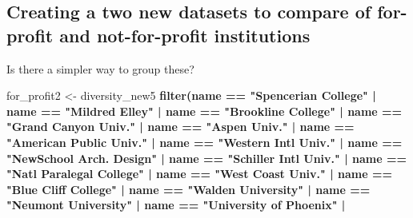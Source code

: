\documentclass[
]{article}
\newenvironment{Shaded}{\begin{snugshade}}{\end{snugshade}}
\newcommand{\KeywordTok}[1]{\textcolor[rgb]{0.13,0.29,0.53}{\textbf{#1}}}
\newcommand{\NormalTok}[1]{#1}
\newcommand{\OperatorTok}[1]{\textcolor[rgb]{0.81,0.36,0.00}{\textbf{#1}}}
\newcommand{\StringTok}[1]{\textcolor[rgb]{0.31,0.60,0.02}{#1}}
\begin{document}
\hypertarget{creating-a-two-new-datasets-to-compare-of-for-profit-and-not-for-profit-institutions}{%
\subsection{\texorpdfstring{\textbf{Creating a two new datasets to
compare of for-profit and not-for-profit
institutions}}{Creating a two new datasets to compare of for-profit and not-for-profit institutions}}\label{creating-a-two-new-datasets-to-compare-of-for-profit-and-not-for-profit-institutions}}

Is there a simpler way to group these?

\begin{Shaded}
\begin{Highlighting}[]
\NormalTok{for_profit2 <-}\StringTok{ }\NormalTok{diversity_new5 }\OperatorTok{%
\StringTok{  }\KeywordTok{filter}\NormalTok{(name }\OperatorTok{==}\StringTok{ "Spencerian College"} \OperatorTok{|}
\StringTok{           }\NormalTok{name }\OperatorTok{==}\StringTok{ "Mildred Elley"} \OperatorTok{|}\StringTok{ }
\StringTok{           }\NormalTok{name }\OperatorTok{==}\StringTok{ "Brookline College"} \OperatorTok{|}\StringTok{ }
\StringTok{           }\NormalTok{name }\OperatorTok{==}\StringTok{ "Grand Canyon Univ."} \OperatorTok{|}\StringTok{ }
\StringTok{           }\NormalTok{name }\OperatorTok{==}\StringTok{ "Aspen Univ."} \OperatorTok{|}\StringTok{ }
\StringTok{           }\NormalTok{name }\OperatorTok{==}\StringTok{ "American Public Univ."} \OperatorTok{|}\StringTok{ }
\StringTok{           }\NormalTok{name }\OperatorTok{==}\StringTok{ "Western Intl Univ."} \OperatorTok{|}\StringTok{ }
\StringTok{           }\NormalTok{name }\OperatorTok{==}\StringTok{ "NewSchool Arch. Design"} \OperatorTok{|}\StringTok{ }
\StringTok{           }\NormalTok{name }\OperatorTok{==}\StringTok{ "Schiller Intl Univ."} \OperatorTok{|}\StringTok{ }
\StringTok{           }\NormalTok{name }\OperatorTok{==}\StringTok{ "Natl Paralegal College"} \OperatorTok{|}\StringTok{ }
\StringTok{           }\NormalTok{name }\OperatorTok{==}\StringTok{ "West Coast Univ."} \OperatorTok{|}\StringTok{ }
\StringTok{           }\NormalTok{name }\OperatorTok{==}\StringTok{ "Blue Cliff College"} \OperatorTok{|}\StringTok{ }
\StringTok{           }\NormalTok{name }\OperatorTok{==}\StringTok{ "Walden University"} \OperatorTok{|}
\StringTok{           }\NormalTok{name }\OperatorTok{==}\StringTok{ "Neumont University"} \OperatorTok{|}
\StringTok{           }\NormalTok{name }\OperatorTok{==}\StringTok{ "University of Phoenix"} \OperatorTok{|}\StringTok{ }
}
\end{Highlighting}
\end{Shaded}
\end{document}
